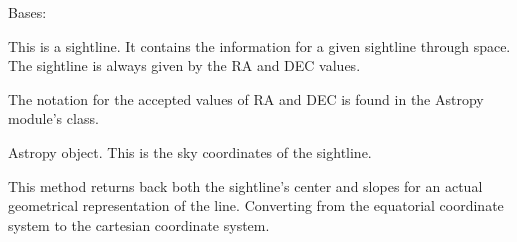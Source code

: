 \documentclass[letterpaper,10pt,english]{sphinxmanual}
\begin{document}
\begin{fulllineitems}
\begin{fulllineitems}
\begin{quote}
\begin{description}
\begin{itemize}
\end{itemize}

\end{description}\end{quote}

\end{fulllineitems}


\end{fulllineitems}


\begin{fulllineitems}
\label{\detokenize{model_observing:model_observing.Sightline}}
Bases: 

This is a sightline. It contains the information for a given sightline
through space. The sightline is always given by the RA and DEC values.

The notation for the accepted values of RA and DEC is found in the
Astropy module’s  class.

\begin{fulllineitems}
\label{\detokenize{model_observing:model_observing.Sightline.self.coordinates}}
Astropy  object. \textendash{} This is the sky coordinates of the sightline.

\end{fulllineitems}


\begin{fulllineitems}
\label{\detokenize{model_observing:model_observing.Sightline.sightline_parameters}}
This method returns back both the sightline’s center and slopes for
an actual geometrical representation of the line. Converting from
the equatorial coordinate system to the cartesian coordinate system.


\end{fulllineitems}
\end{fulllineitems}
\end{document}

